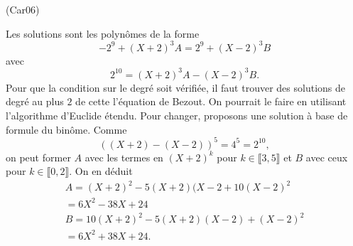 \begin{tiny}(Car06)\end{tiny} Les solutions sont les polynômes de la forme
\[
 -2^9 + (X+2)^3 A = 2^9 +(X-2)^3B
\]
avec 
\[
 2^{10} = (X+2)^3 A - (X-2)^3 B.
\]
Pour que la condition sur le degré soit vérifiée, il faut trouver des solutions de degré au plus $2$ de cette l'équation de Bezout. On pourrait le faire en utilisant l'algorithme d'Euclide étendu. Pour changer, proposons une solution à base de formule du binôme. Comme
\[
 \left( (X+2) - (X-2)\right)^5 = 4 ^5 = 2^{10}, 
\]
on peut former $A$ avec les termes en $(X+2)^k$ pour $k\in \llbracket 3,5\rrbracket$ et $B$ avec ceux pour $k\in \llbracket 0,2\rrbracket$. On en déduit
\begin{multline*}
 A = (X+2)^2 - 5(X+2)(X-2 + 10(X-2)^2 \\
 = 6X^2 - 38X + 24\\
 B = 10(X+2)^2 - 5(X+2)(X-2) + (X-2)^2\\
 = 6X^2 + 38X +24.
\end{multline*}

